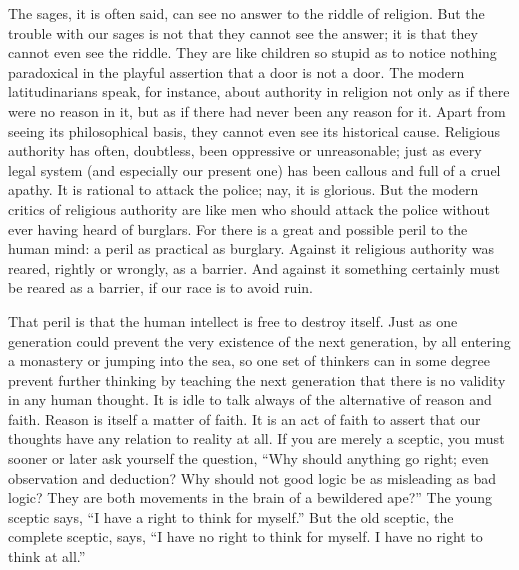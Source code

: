 \documentclass{book}
\begin{document}
The sages, it is often said, can see no answer to the riddle of religion. But the trouble with our sages is not that they cannot see the answer; it is that they cannot even see the riddle. They are like children so stupid as to notice nothing paradoxical in the playful assertion that a door is not a door. The modern latitudinarians speak, for instance, about authority in religion not only as if there were no reason in it, but as if there had never been any reason for it. Apart from seeing its philosophical basis, they cannot even see its historical cause. Religious authority has often, doubtless, been oppressive or unreasonable; just as every legal system (and especially our present one) has been callous and full of a cruel apathy. It is rational to attack the police; nay, it is glorious. But the modern critics of religious authority are like men who should attack the police without ever having heard of burglars. For there is a great and possible peril to the human mind: a peril as practical as burglary. Against it religious authority was reared, rightly or wrongly, as a barrier. And against it something certainly must be reared as a barrier, if our race is to avoid ruin.

That peril is that the human intellect is free to destroy itself. Just as one generation could prevent the very existence of the next generation, by all entering a monastery or jumping into the sea, so one set of thinkers can in some degree prevent further thinking by teaching the next generation that there is no validity in any human thought. It is idle to talk always of the alternative of reason and faith. Reason is itself a matter of faith. It is an act of faith to assert that our thoughts have any relation to reality at all. If you are merely a sceptic, you must sooner or later ask yourself the question, “Why should anything go right; even observation and deduction? Why should not good logic be as misleading as bad logic? They are both movements in the brain of a bewildered ape?” The young sceptic says, “I have a right to think for myself.” But the old sceptic, the complete sceptic, says, “I have no right to think for myself. I have no right to think at all.”
\end{document}
